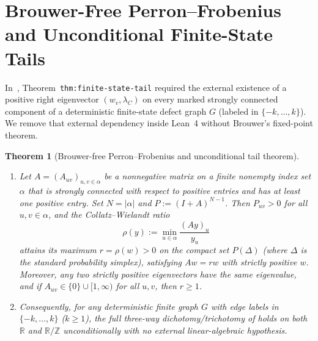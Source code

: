 \documentclass[11pt]{article}
\newtheorem{theorem}{Theorem}[section]
\theoremstyle{definition}
\theoremstyle{remark}
\newcommand{\R}{\mathbb{R}}
\newcommand{\Z}{\mathbb{Z}}
\begin{document}
\section{Brouwer-Free Perron--Frobenius and Unconditional Finite-State Tails}\label{sec:perron}

In~\cite{Paper2}, Theorem~\texttt{thm:finite-state-tail} required the external
existence of a positive right eigenvector $(w_v,\lambda_C)$ on every marked
strongly connected component of a deterministic finite-state defect graph $G$
(labeled in $\{-k,\dots,k\}$). We remove that external dependency inside Lean~4
without Brouwer's fixed-point theorem.

\begin{theorem}[Brouwer-free Perron--Frobenius and unconditional tail theorem]\label{thm:finite-state-unconditional}
\leavevmode
\begin{enumerate}[label=\textup{(\roman*)},leftmargin=2.2em]
\item Let $A=(A_{uv})_{u,v\in\alpha}$ be a nonnegative matrix on a finite
nonempty index set $\alpha$ that is strongly connected with respect to positive
entries and has at least one positive entry. Set $N=|\alpha|$ and
$P:=(I+A)^{N-1}$. Then $P_{uv}>0$ for all $u,v\in\alpha$, and the
Collatz--Wielandt ratio
\[
\rho(y):=\min_{u\in\alpha}\frac{(Ay)_u}{y_u}
\]
attains its maximum $r=\rho(w)>0$ on the compact set $P(\Delta)$ (where $\Delta$
is the standard probability simplex), satisfying $Aw=rw$ with strictly positive
$w$. Moreover, any two strictly positive eigenvectors have the same eigenvalue,
and if $A_{uv}\in\{0\}\cup[1,\infty)$ for all $u,v$, then $r\ge 1$.
\item Consequently, for any deterministic finite graph $G$ with edge labels in
$\{-k,\dots,k\}$ ($k\ge1$), the full three-way dichotomy/trichotomy of
\cite[Theorem~\texttt{thm:finite-state-tail}]{Paper2} holds on both $\R$ and
$\R/\Z$ unconditionally with no external linear-algebraic hypothesis.
\end{enumerate}
\end{theorem}
\end{document}
